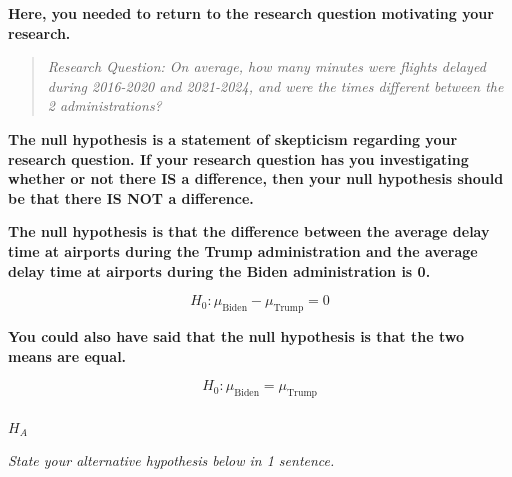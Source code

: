 \documentclass[
  letterpaper,
  DIV=11,
  numbers=noendperiod]{scrartcl}
\makeatletter
\let\oldparagraph\paragraph
\renewcommand{\paragraph}{
    \@ifstar
      \xxxParagraphStar
      \xxxParagraphNoStar
  }
\newcommand{\xxxParagraphStar}[1]{\oldparagraph*{#1}\mbox{}}
\newcommand{\xxxParagraphNoStar}[1]{\oldparagraph{#1}\mbox{}}
\makeatother
\begin{document}
\begin{tcolorbox}[enhanced jigsaw, colback=white, breakable, arc=.35mm, left=2mm, colframe=quarto-callout-warning-color-frame, opacityback=0, rightrule=.15mm, toprule=.15mm, bottomrule=.15mm, leftrule=.75mm]

\textbf{Here, you needed to return to the research question motivating
your research.}

\begin{quote}
\emph{Research Question: On average, how many minutes were flights
delayed during 2016-2020 and 2021-2024, and were the times different
between the 2 administrations?}
\end{quote}

\textbf{The null hypothesis is a statement of skepticism regarding your
research question. If your research question has you investigating
whether or not there IS a difference, then your null hypothesis should
be that there IS NOT a difference.}

\textbf{The null hypothesis is that the difference between the average
delay time at airports during the Trump administration and the average
delay time at airports during the Biden administration is 0.}

\[
H_0 \colon \mu_{\text{Biden}}-\mu_{\text{Trump}}=0
\]

\textbf{You could also have said that the null hypothesis is that the
two means are equal.}

\[
H_0 \colon \mu_{\text{Biden}}=\mu_{\text{Trump}}
\]

\end{tcolorbox}

\paragraph{\texorpdfstring{\(H_A\)}{H\_A}}\label{h_a-1}

\emph{State your alternative hypothesis below in 1 sentence.}
\end{document}
